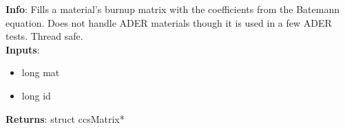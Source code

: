 \textbf{Info}: Fills a material's burnup matrix with the coefficients from the
Batemann equation. Does not handle ADER materials though it is used in a few ADER
tests. Thread safe. \\

\noindent \textbf{Inputs}:
\begin{itemize}
\item{long mat}
\item{long id}
\end{itemize}

\noindent \textbf{Returns}: struct ccsMatrix*
